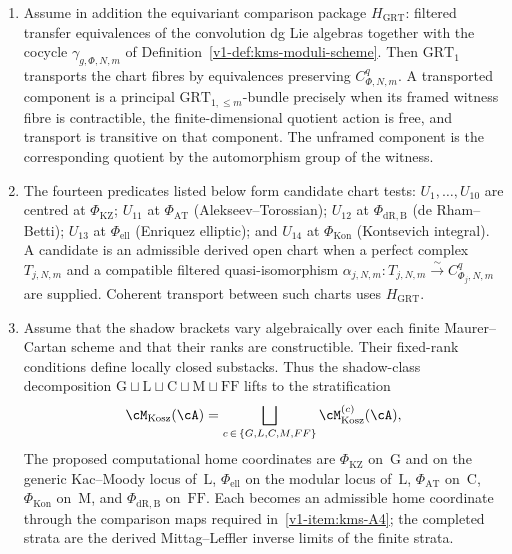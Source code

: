 \begin{theorem}
\begin{enumerate}[label=\textup{(A\arabic*)},leftmargin=3em]
 $\mathbb T_\Phi\mathrm{Assoc}$; passing to the unframed quotient
 takes the homotopy quotient by the infinitesimal gauge action.
 The acyclicity condition is open and therefore adds no
 infinitesimal equation at a point of the locus.  First-order
 deformations and obstructions are the degree~$0$ and degree~$1$
 cohomology of this tangent complex.
\item\label{v1-item:kms-A3}
 Assume in addition the equivariant comparison package
 $H_{\mathrm{GRT}}$: filtered transfer equivalences of the
 convolution dg Lie algebras together with the cocycle
 $\gamma_{g,\Phi,N,m}$ of Definition~\ref{v1-def:kms-moduli-scheme}.
 Then $\mathrm{GRT}_1$ transports the chart fibres by equivalences
 preserving $C^q_{\Phi,N,m}$.  A transported component is a
 principal $\mathrm{GRT}_{1,\le m}$-bundle precisely when its
 framed witness fibre is contractible, the finite-dimensional
 quotient action is free, and transport is transitive on that
 component.  The unframed component is the corresponding quotient by
 the automorphism group of the witness.
\item\label{v1-item:kms-A4}
 The fourteen predicates listed below form candidate chart tests:
 $U_1,\ldots,U_{10}$ are centred at $\Phi_{\mathrm{KZ}}$;
 $U_{11}$ at $\Phi_{\mathrm{AT}}$ (Alekseev--Torossian);
 $U_{12}$ at $\Phi_{\mathrm{dR,B}}$ (de Rham--Betti);
 $U_{13}$ at $\Phi_{\mathrm{ell}}$ (Enriquez elliptic); and
 $U_{14}$ at $\Phi_{\mathrm{Kon}}$ (Kontsevich integral).
 A candidate is an admissible derived open chart when a perfect
 complex $T_{j,N,m}$ and a compatible filtered quasi-isomorphism
 $\alpha_{j,N,m}\colon T_{j,N,m}\xrightarrow{\sim}
 C^q_{\Phi_j,N,m}$ are supplied.  Coherent transport between such
 charts uses $H_{\mathrm{GRT}}$.
\item\label{v1-item:kms-A5}
 Assume that the shadow brackets vary algebraically over each finite
 Maurer--Cartan scheme and that their ranks are constructible.  Their
 fixed-rank conditions define locally closed substacks.  Thus the
 shadow-class decomposition
 $\mathrm{G} \sqcup \mathrm{L} \sqcup \mathrm{C}
 \sqcup \mathrm{M} \sqcup \mathrm{FF}$ lifts to the
 stratification
 \[
 \cM_{\mathrm{Kosz}}(\cA)
 = \bigsqcup_{c\,\in\,\{G,L,C,M,FF\}}
 \cM^{(c)}_{\mathrm{Kosz}}(\cA),
 \]
 The proposed computational home coordinates are
 $\Phi_{\mathrm{KZ}}$ on~$\mathrm{G}$
 and on the generic Kac--Moody locus of~$\mathrm{L}$,
 $\Phi_{\mathrm{ell}}$ on the modular locus of~$\mathrm{L}$,
 $\Phi_{\mathrm{AT}}$ on~$\mathrm{C}$, $\Phi_{\mathrm{Kon}}$
 on~$\mathrm{M}$, and $\Phi_{\mathrm{dR,B}}$ on~$\mathrm{FF}$.
 Each becomes an admissible home coordinate through the comparison
 maps required in~\ref{v1-item:kms-A4}; the completed strata are the
 derived Mittag--Leffler inverse limits of the finite strata.
\end{enumerate}
\end{theorem}

